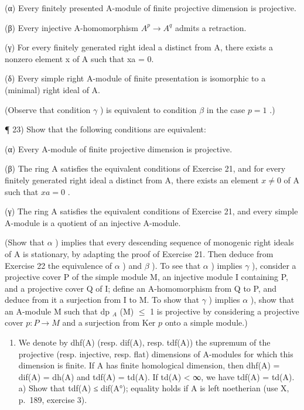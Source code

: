 (α) Every finitely presented A-module of finite projective dimension is projective.

(β) Every injective A-homomorphism \(A^{p} \rightarrow A^{q}\) admits a retraction.

(γ) For every finitely generated right ideal a distinct from A, there exists a nonzero element x of A such that xa = 0.

(δ) Every simple right A-module of finite presentation is isomorphic to a (minimal) right ideal of A.

(Observe that condition \(\gamma\) ) is equivalent to condition \(\beta\) in the case \(p = 1\) .)

¶ 23) Show that the following conditions are equivalent:

(α) Every A-module of finite projective dimension is projective.

(β) The ring A satisfies the equivalent conditions of Exercise 21, and for every finitely generated right ideal a distinct from A, there exists an element \(x \neq 0\) of A such that \(xa = 0\) .

(γ) The ring A satisfies the equivalent conditions of Exercise 21, and every simple A-module is a quotient of an injective A-module.

(Show that \(\alpha\) ) implies that every descending sequence of monogenic right ideals of A is stationary, by adapting the proof of Exercise 21. Then deduce from Exercise 22 the equivalence of \(\alpha\) ) and \(\beta\) ). To see that \(\alpha\) ) implies \(\gamma\) ), consider a projective cover P of the simple module M, an injective module I containing P, and a projective cover Q of I; define an A-homomorphism from Q to P, and deduce from it a surjection from I to M. To show that \(\gamma\) ) implies \(\alpha\) ), show that an A-module M such that dp \(_{A}\) (M) \(\leqslant\) 1 is projective by considering a projective cover \(p: P \to M\) and a surjection from Ker \(p\) onto a simple module.)

\begin{enumerate}
\def\labelenumi{\arabic{enumi})}
\setcounter{enumi}{23}
\tightlist
\item
  We denote by dhf(A) (resp. dif(A), resp. tdf(A)) the supremum of the projective (resp. injective, resp. flat) dimensions of A-modules for which this dimension is finite. If A has finite homological dimension, then dhf(A) = dif(A) = dh(A) and tdf(A) = td(A). If td(A) \textless{} ∞, we have tdf(A) = td(A). a) Show that tdf(A) ≤ dif(A°); equality holds if A is left noetherian (use X, p.~189, exercise 3).
\end{enumerate}

